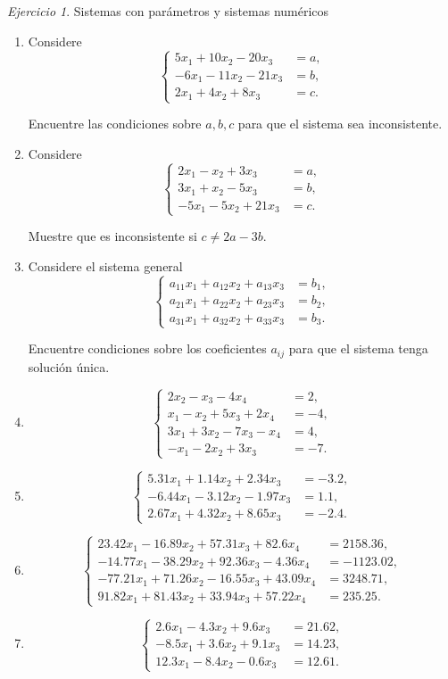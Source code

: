 \documentclass[12pt]{article}
\theoremstyle{remark}
\newtheorem{Ejer}[definicion]{Ejercicio}
\newcommand{\sistema}[1]{%
\[
\left\{
\begin{aligned}
#1
\end{aligned}
\right.
\]
}
\begin{document}
\begin{Ejer}  Sistemas con parámetros y sistemas numéricos

\begin{enumerate}[resume]

\item Considere
\sistema{
5x_1+10x_2-20x_3&=a,\\
-6x_1-11x_2-21x_3&=b,\\
2x_1+4x_2+8x_3&=c.
}
Encuentre las condiciones sobre $a,b,c$ para que el sistema sea inconsistente.

\item Considere
\sistema{
2x_1-x_2+3x_3&=a,\\
3x_1+x_2-5x_3&=b,\\
-5x_1-5x_2+21x_3&=c.
}
Muestre que es inconsistente si $c\neq 2a-3b$.

\item Considere el sistema general
\sistema{
a_{11}x_1+a_{12}x_2+a_{13}x_3&=b_1,\\
a_{21}x_1+a_{22}x_2+a_{23}x_3&=b_2,\\
a_{31}x_1+a_{32}x_2+a_{33}x_3&=b_3.
}
Encuentre condiciones sobre los coeficientes $a_{ij}$ para que el sistema tenga solución única.

\item \sistema{
2x_2-x_3-4x_4&=2,\\
x_1-x_2+5x_3+2x_4&=-4,\\
3x_1+3x_2-7x_3-x_4&=4,\\
-x_1-2x_2+3x_3&=-7.
}

\item \sistema{
5.31x_1+1.14x_2+2.34x_3&=-3.2,\\
-6.44x_1-3.12x_2-1.97x_3&=1.1,\\
2.67x_1+4.32x_2+8.65x_3&=-2.4.
}

\item \sistema{
23.42x_1-16.89x_2+57.31x_3+82.6x_4&=2158.36,\\
-14.77x_1-38.29x_2+92.36x_3-4.36x_4&=-1123.02,\\
-77.21x_1+71.26x_2-16.55x_3+43.09x_4&=3248.71,\\
91.82x_1+81.43x_2+33.94x_3+57.22x_4&=235.25.
}

\item \sistema{
2.6x_1-4.3x_2+9.6x_3&=21.62,\\
-8.5x_1+3.6x_2+9.1x_3&=14.23,\\
12.3x_1-8.4x_2-0.6x_3&=12.61.
}


\end{enumerate}
\end{Ejer}
\end{document}
